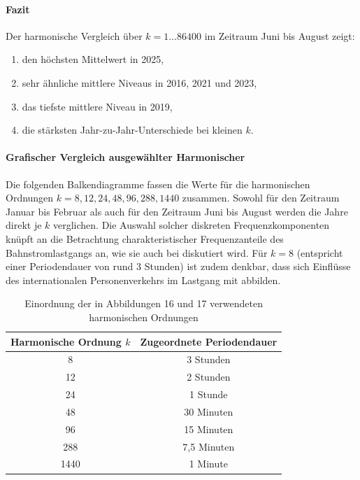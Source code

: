 \documentclass[12pt,oneside]{article}
\begin{document}
\paragraph{Fazit}
Der harmonische Vergleich über $k=1\dots86400$ im Zeitraum Juni bis August zeigt:
\begin{enumerate}
  \item den höchsten Mittelwert in 2025,
  \item sehr ähnliche mittlere Niveaus in 2016, 2021 und 2023,
  \item das tiefste mittlere Niveau in 2019,
  \item die stärksten Jahr-zu-Jahr-Unterschiede bei kleinen $k$.
\end{enumerate}

\paragraph{Grafischer Vergleich ausgewählter Harmonischer}
Die folgenden Balkendiagramme fassen die Werte für die harmonischen Ordnungen
$k=8,12,24,48,96,288,1440$ zusammen. Sowohl für den Zeitraum Januar bis Februar als auch für den Zeitraum Juni bis August werden die Jahre direkt je $k$ verglichen. Die Auswahl solcher diskreten Frequenzkomponenten knüpft an die Betrachtung charakteristischer Frequenzanteile des Bahnstromlastgangs an, wie sie auch bei \cite{bosch_frequenzkomponenten_bahnstromlastgangs} diskutiert wird.
Für $k=8$ (entspricht einer Periodendauer von rund 3 Stunden) ist zudem denkbar, dass sich Einflüsse des internationalen Personenverkehrs im Lastgang mit abbilden.

\begin{table}[H]
  \centering
  \caption{Einordnung der in Abbildungen 16 und 17 verwendeten harmonischen Ordnungen}
  \begin{tabular}{cc}
    \toprule
    Harmonische Ordnung $k$ & Zugeordnete Periodendauer \\
    \midrule
    8 & 3 Stunden \\
    12 & 2 Stunden \\
    24 & 1 Stunde \\
    48 & 30 Minuten \\
    96 & 15 Minuten \\
    288 & 7{,}5 Minuten \\
    1440 & 1 Minute \\
    \bottomrule
  \end{tabular}
\end{table}
\end{document}
